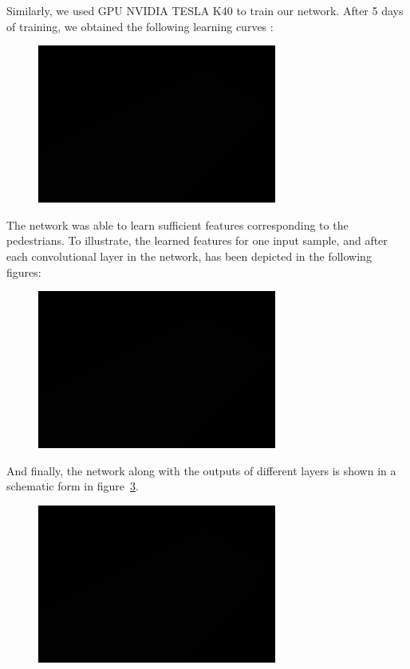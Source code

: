 \noindent Similarly, we used GPU NVIDIA TESLA K40 to train our network. After 5 days of training, we obtained the following learning curves :

\begin{figure}[H]
	\centering
	{\includegraphics[width=0.7\textwidth]{images/1}}
	\caption{}
	\label{fig:ucsdcurve}
\end{figure}

\noindent The network was able to learn sufficient features corresponding to the pedestrians. To illustrate, the learned features for one input sample, and after each convolutional layer in the network, has been depicted in the following figures: 



\begin{figure}[H]
	\centering
	{\includegraphics[width=0.7\textwidth]{images/1}}
	\caption{}
	\label{fig:feats}
\end{figure}

And finally, the network along with the outputs of different layers is shown in a schematic form in figure~\ref{fig:ucsdout}.

\begin{figure}[H]
	\centering
	{\includegraphics[width=0.7\textwidth]{images/1}}
	\caption{}
	\label{fig:ucsdout}
\end{figure}

